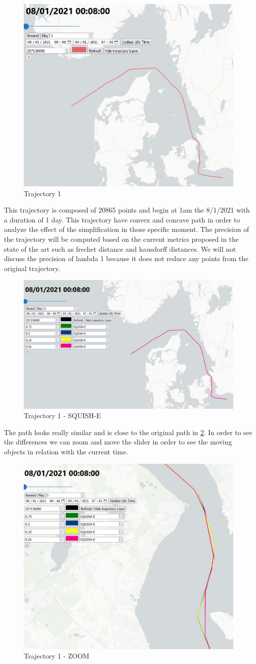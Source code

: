 \begin{figure}[!h]
\centering
\includegraphics[width=0.5\linewidth]{figures/Stats/traj_1.jpg}
\caption{Trajectory 1}
\label{fig:traj_1}
\end{figure}

This trajectory is composed of 20865 points and begin at 1am the 8/1/2021 with a duration of 1 day. This trajectory have convex and concave path in order to analyze the effect of the simplification in those specific moment. The precision of the trajectory will be computed based on the current metrics proposed in the state of the art such as frechet distance and hausdorff distances. We will not discuss the precision of lambda 1 because it does not reduce any points from the original trajectory.



\begin{figure}[!h]
\centering
\includegraphics[width=0.5\linewidth]{figures/Stats/squish_1.jpg}
\caption{Trajectory 1 - SQUISH-E}
\label{fig:traj_1_squish}
\end{figure}

The path looks really similar and is close to the original path in \ref{fig:traj_1_squish}. In order to see the differences we can zoom and move the slider in order to see the moving objects in relation with the current time.

\begin{figure}[!h]
\centering
\includegraphics[width=0.5\linewidth]{figures/Stats/squish_1_zoom.jpg}
\caption{Trajectory 1 - ZOOM }
\label{fig:traj_1_sqzoom}
\end{figure}

